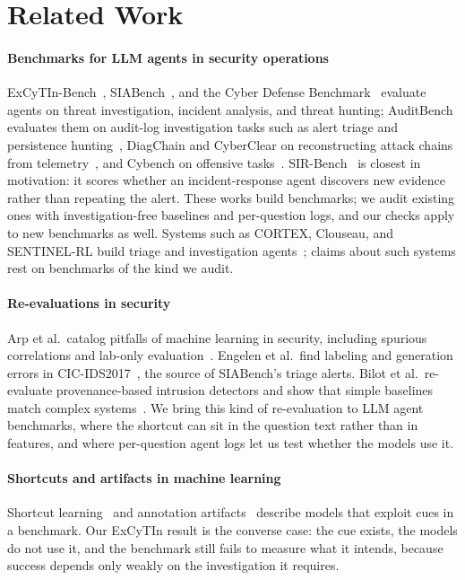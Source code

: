 \section{Related Work}
\label{sec:related}

\paragraph{Benchmarks for LLM agents in security operations} ExCyTIn-Bench~\citep{excytin}, SIABench~\citep{siabench}, and the Cyber Defense Benchmark~\citep{cyberdefensebench} evaluate agents on threat investigation, incident analysis, and threat hunting; AuditBench evaluates them on audit-log investigation tasks such as alert triage and persistence hunting~\citep{auditbench}, DiagChain and CyberClear on reconstructing attack chains from telemetry~\citep{diagchain,cyberclear}, and Cybench on offensive tasks~\citep{cybench}. SIR-Bench~\citep{sirbench} is closest in motivation: it scores whether an incident-response agent discovers new evidence rather than repeating the alert. These works build benchmarks; we audit existing ones with investigation-free baselines and per-question logs, and our checks apply to new benchmarks as well. Systems such as CORTEX, Clouseau, and SENTINEL-RL build triage and investigation agents~\citep{cortex,clouseau,sentinelrl}; claims about such systems rest on benchmarks of the kind we audit.

\paragraph{Re-evaluations in security} Arp et al.\ catalog pitfalls of machine learning in security, including spurious correlations and lab-only evaluation~\citep{arp2022dos}. Engelen et al.\ find labeling and generation errors in CIC-IDS2017~\citep{engelen2021cicids}, the source of SIABench's triage alerts. Bilot et al.\ re-evaluate provenance-based intrusion detectors and show that simple baselines match complex systems~\citep{bilot2025simpler}. We bring this kind of re-evaluation to LLM agent benchmarks, where the shortcut can sit in the question text rather than in features, and where per-question agent logs let us test whether the models use it.

\paragraph{Shortcuts and artifacts in machine learning} Shortcut learning~\citep{geirhos2020shortcut} and annotation artifacts~\citep{gururangan2018artifacts} describe models that exploit cues in a benchmark. Our ExCyTIn result is the converse case: the cue exists, the models do not use it, and the benchmark still fails to measure what it intends, because success depends only weakly on the investigation it requires.
